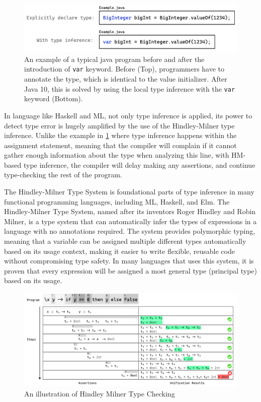 \begin{figure}[hbt]
  \includegraphics[width=\linewidth]{ExampleJava}
  \caption{
    \label{fig:example-java}
      An example of a typical java program before and after the introduction of \texttt{var} keyword. Before (Top), programmers have to annotate the type, which is identical to the value initializer. After Java 10, this is solved by using the local type inference with the \texttt{var} keyword (Bottom).
    }
\end{figure}

In language like Haskell and ML, not only type inference is applied, its power to detect type error is hugely amplified by the use of the Hindley-Milner type inference. Unlike the example in \ref{fig:example-java} where type inference happens within the assignment statement, meaning that the compiler will complain if it cannot gather enough information about the type when analyzing this line, with HM-based type inference, the compiler will delay making any assertions, and continue type-checking the rest of the program. 

The Hindley-Milner Type System \cite{Damas1982-zw} is foundational parts of type inference in many functional programming languages, including ML, Haskell, and Elm. The Hindley-Milner Type System, named after its inventors Roger Hindley and Robin Milner, is a type system that can automatically infer the types of expressions in a language with no annotations required. The system provides polymorphic typing, meaning that a variable can be assigned multiple different types automatically based on its usage context, making it easier to write flexible, reusable code without compromising type safety. In many languages that uses this system, it is proven that every expression will be assigned a most general type (principal type) based on its usage. 



\begin{figure}[hbt]
    \includegraphics[width=\linewidth]{Hindley-Milner}
    \caption{
      \label{fig:hindley-milner}
        An illustration of Hindley Milner Type Checking}
\end{figure}


